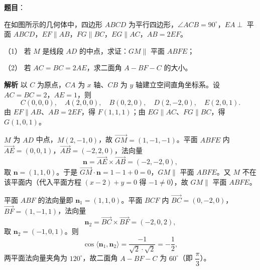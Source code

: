 \begin{answer}

\textbf{题目}：

在如图所示的几何体中，四边形 $ABCD$ 为平行四边形，$\angle ACB=90^\circ$，$EA\perp$ 平面 $ABCD$，$EF\parallel AB$，$FG\parallel BC$，$EG\parallel AC$，$AB=2EF$。

（1） 若 $M$ 是线段 $AD$ 的中点，求证：$GM\parallel$ 平面 $ABFE$；

（2） 若 $AC=BC=2AE$，求二面角 $A-BF-C$ 的大小。
\nopagebreak[4]
\begin{center}\end{center}
\nopagebreak[4]
\textbf{解析}
以 $C$ 为原点，$CA$ 为 $x$ 轴、$CB$ 为 $y$ 轴建立空间直角坐标系。设 $AC=BC=2$，$AE=1$，则
\nopagebreak[4]
\[C(0,0,0),\quad A(2,0,0),\quad B(0,2,0),\quad D(2,-2,0),\quad E(2,0,1).\]
由 $EF\parallel AB$、$AB=2EF$，得 $F(1,1,1)$；由 $EG\parallel AC$、$FG\parallel BC$，得 $G(1,0,1)$。

$M$ 为 $AD$ 中点，$M(2,-1,0)$，故 $\overrightarrow{GM}=(1,-1,-1)$。平面 $ABFE$ 内 $\overrightarrow{AE}=(0,0,1)$，$\overrightarrow{AB}=(-2,2,0)$，法向量
\nopagebreak[4]
\[\boldsymbol n=\overrightarrow{AE}\times\overrightarrow{AB}=(-2,-2,0),\]
取 $\boldsymbol n=(1,1,0)$。于是 $\overrightarrow{GM}\cdot\boldsymbol n=1-1+0=0$，$GM\parallel$ 平面 $ABFE$。又 $M$ 不在该平面内（代入平面方程 $(x-2)+y=0$ 得 $-1\neq0$），故 $GM\parallel$ 平面 $ABFE$。

平面 $ABF$ 的法向量即 $\boldsymbol n_1=(1,1,0)$。平面 $BCF$ 内 $\overrightarrow{BC}=(0,-2,0)$，$\overrightarrow{BF}=(1,-1,1)$，法向量
\nopagebreak[4]
\[\boldsymbol n_2=\overrightarrow{BC}\times\overrightarrow{BF}=(-2,0,2),\]
取 $\boldsymbol n_2=(-1,0,1)$。则
\nopagebreak[4]
\[\cos\langle\boldsymbol n_1,\boldsymbol n_2\rangle=\frac{-1}{\sqrt2\cdot\sqrt2}=-\frac12,\]
两平面法向量夹角为 $120^\circ$，故二面角 $A-BF-C$ 为 $60^\circ$（即 $\dfrac\pi3$）。



\end{answer}

